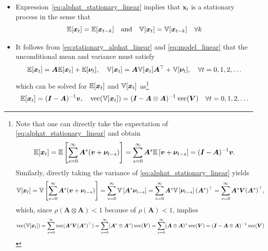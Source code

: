 \documentclass[12pt,a4paper]{article}
\DeclareMathOperator{\vect}{vec}
\begin{document}
\begin{itemize}
\begin{itemize}
  \item Expression~\eqref{eq:alphat_stationary_linear} implies that
    $\bm{x}_{t}$ is a stationary process in the sense that
    \begin{equation}\label{eq:stationary_alphat_linear}%
      \E[\bm{x}_{t}] = \E[\bm{x}_{t-k}]
      \quad\text{and}\quad
      \V[\bm{x}_{t}] = \V[\bm{x}_{t-k}] \quad \forall k
    \end{equation}

  \item It follows from \eqref{eq:stationary_alphat_linear} and
    \eqref{eq:model_linear} that the unconditional mean and variance
    must satisfy
    \begin{equation}\nonumber%
      \E[\bm{x}_{t}] = \bm{A}\E[\bm{x}_{t}] + \E[\bm{\nu}_{t}],
      \quad
      \V[\bm{x}_{t}] = \bm{A}\V[\bm{x}_{t}]\bm{A}^{\top} + \V[\bm{\nu}_{t}],
      \quad \forall t = 0, 1, 2, \ldots
    \end{equation}
    which can be solved for $\mathbb{E}[\bm{x}_{t}]$ and $\mathbb{V}[\bm{x}_{t}]$ as\footnote{ Note that
      one can directly take the expectation of
      \eqref{eq:alphat_stationary_linear} and obtain
      \begin{equation}\nonumber%
        \E[\bm{x}_{t}]
        = \E \left[ \sum_{s=0}^{\infty}\bm{A}^{s}(\bm{v}+\bm{\nu}_{t-s}) \right] 
        = \sum_{s=0}^{\infty}\bm{A}^{s}\E \left[ \bm{v}+\bm{\nu}_{t-s} \right] =(\bm{I}-\bm{A})^{-1}\bm{v}.
      \end{equation}
      Similarly, directly taking the variance of
      \eqref{eq:alphat_stationary_linear} yields
      \begin{equation}\nonumber%
        \V[\bm{x}_{t}]
        = \V \left[ \sum_{s=0}^{\infty}\bm{A}^{s}(\bm{v}+\bm{\nu}_{t-s}) \right] 
        = \sum_{s=0}^{\infty}\V\left[ \bm{A}^{s}\bm{\nu}_{t-s} \right] 
        = \sum_{s=0}^{\infty}\bm{A}^{s}\V\left[\bm{\nu}_{t-s} \right] (\bm{A}^{s})^{\top}
        = \sum_{s=0}^{\infty}\bm{A}^{s}\bm{V}(\bm{A}^{s})^{\top},
      \end{equation}
      which, since $\rho(\bm{A}\otimes \bm{A})<1$ because of $\rho(\bm{A})<1$,
      implies
      \begin{equation}\nonumber%
        \vect(\V[\bm{x}_{t}])
        = \sum_{s=0}^{\infty}\vect(\bm{A}^{s}\bm{V}(\bm{A}^{s})^{\top})
        = \sum_{s=0}^{\infty}(\bm{A}^{s}\otimes \bm{A}^{s})\vect(\bm{V})
        = \sum_{s=0}^{\infty}(\bm{A}\otimes \bm{A})^{s}\vect(\bm{V})
        = (\bm{I} - \bm{A}\otimes \bm{A})^{-1}\vect(\bm{V})
      \end{equation}
    }
    \begin{equation}\nonumber%
      \E[\bm{x}_{t}] = (\bm{I}-\bm{A})^{-1}\bm{v},
      \quad
      \vect(\V[\bm{x}_{t}]) = (\bm{I} - \bm{A}\otimes \bm{A})^{-1}\vect(\bm{V})
      \quad \forall t = 0, 1, 2, \ldots
    \end{equation}


\end{itemize}
\end{itemize}
\end{document}
